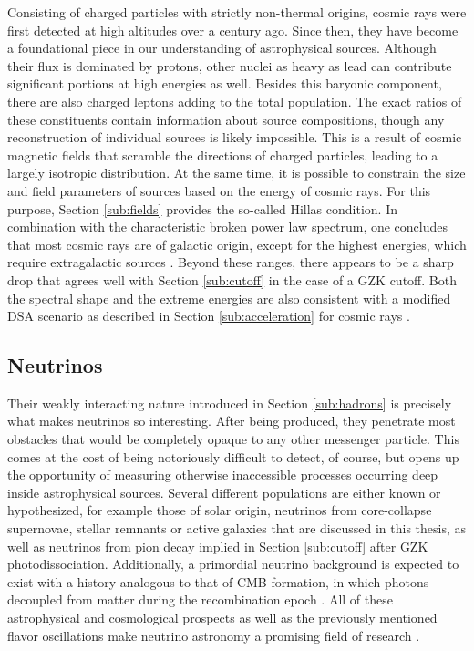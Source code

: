 \begin{spacing}{0.990}
	Consisting of charged particles with strictly non-thermal origins, cosmic rays were first detected at high altitudes over a
	century ago. Since then, they have become a foundational piece in our understanding of astrophysical sources. Although their flux
	is dominated by protons, other nuclei as heavy as lead can contribute significant portions at high energies as well. Besides this
	baryonic component, there are also charged leptons adding to the total population. The exact ratios of these constituents contain
	information about source compositions, though any reconstruction of individual sources is likely impossible. This is a result
	of cosmic magnetic fields that scramble the directions of charged particles, leading to a largely isotropic distribution. At the
	same time, it is possible to constrain the size and field parameters of sources based on the energy of cosmic rays. For this
	purpose, Section \ref{sub:fields} provides the so-called Hillas condition. In combination with the characteristic broken power
	law spectrum, one concludes that most cosmic rays are of galactic origin, except for the highest energies, which require
	extragalactic sources \cite{Tjus_2020, Drury_2012}. Beyond these ranges, there appears to be a sharp drop that agrees well with
	Section \ref{sub:cutoff} in the case of a GZK cutoff. Both the spectral shape and the extreme energies are also consistent with
	a modified DSA scenario as described in Section \ref{sub:acceleration} for cosmic rays \cite{Becker_2008}.
	\newpage
\end{spacing}



\subsection{Neutrinos}
\label{sub:neutrinos}

Their weakly interacting nature introduced in Section \ref{sub:hadrons} is precisely what makes neutrinos so interesting. After
being produced, they penetrate most obstacles that would be completely opaque to any other messenger particle. This comes at the
cost of being notoriously difficult to detect, of course, but opens up the opportunity of measuring otherwise inaccessible processes
occurring deep inside astrophysical sources. Several different populations are either known or hypothesized, for example
those of solar origin, neutrinos from core-collapse supernovae, stellar remnants or active galaxies that are discussed in this thesis,
as well as neutrinos from pion decay implied in Section \ref{sub:cutoff} after GZK photodissociation. Additionally, a primordial
neutrino background is expected to exist with a history analogous to that of CMB formation, in which photons decoupled
from matter during the recombination epoch \cite{Becker_2008}. All of these astrophysical and cosmological prospects as well as the
previously mentioned flavor oscillations make neutrino astronomy a promising field of research \cite{Meszaros_2019}.



